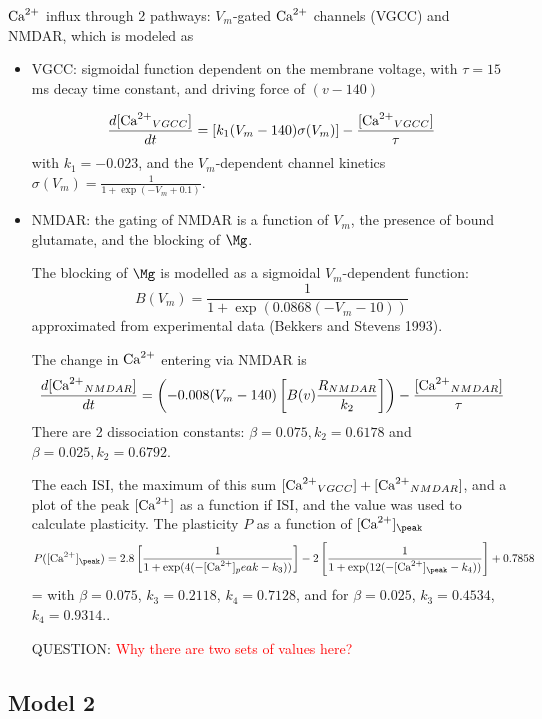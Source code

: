${\text{Ca}^{2+}}$ influx through 2 pathways: $V_m$-gated ${\text{Ca}^{2+}}$ channels (VGCC) and NMDAR,
which is modeled as
\begin{itemize}
  \item VGCC: sigmoidal function dependent on the membrane voltage, with $\tau
  = 15$ ms decay time constant, and driving force of $(v-140)$
  
\begin{equation}
\frac{d[{\text{Ca}^{2+}}_{VGCC}]}{dt} = \left[ k_1(V_m-140)\sigma(V_m) \right] -
\frac{[{\text{Ca}^{2+}}_{VGCC}]}{\tau}
\end{equation}  
with $k_1 = -0.023$, and the $V_m$-dependent channel kinetics
$\sigma(V_m) = \frac{1}{1+\exp(-V_m+0.1)}$.

  \item NMDAR: the gating of NMDAR is a function of $V_m$, the presence of
  bound glutamate, and the blocking of $\Mg$.
  
  The blocking of $\Mg$ is modelled as a sigmoidal $V_m$-dependent function:
  \begin{equation}
  B(V_m) = 	\frac{1}{1+\exp(0.0868 (-V_m-10))}
  \end{equation}
  approximated from experimental data (Bekkers and Stevens 1993).
  
  The change in ${\text{Ca}^{2+}}$ entering via NMDAR is
\begin{equation}
\frac{d[{\text{Ca}^{2+}}_{NMDAR}]}{dt} = \left(  -0.008 (V_m-140) \left[
B(v)\frac{R_{NMDAR}}{k_2} \right] \right) - \frac{[{\text{Ca}^{2+}}_{NMDAR}]}{\tau}
\end{equation}
There are 2 dissociation constants: $\beta = 0.075, k_2 = 0.6178$ and 
$\beta = 0.025, k_2 = 0.6792$.

The each ISI, the maximum of this sum $[{\text{Ca}^{2+}}_{VGCC}]+[{\text{Ca}^{2+}}_{NMDAR}]$, and a
plot of the peak $[{\text{Ca}^{2+}}]$ as a function if ISI, and the value was used to
calculate plasticity.
The plasticity $P$ as a function of $[\Ca]_\peak$
\begin{equation}
P([\Ca]_\peak) = 2.8 \left[ \frac{1}{1+\exp(4(-[\Ca]_peak - k_3))}  \right]
 - 2 \left[ \frac{1}{1+ \exp(12(-[\Ca]_\peak - k_4))} \right] + 0.7858
\end{equation}=
with $\beta = 0.075$, $k_3 = 0.2118$, $k_4 = 0.7128$, and for  $\beta= 0.025$,
$k_3 = 0.4534$, $k_4 = 0.9314.$.

QUESTION: \textcolor{red}{Why there are two sets of values here?}

\end{itemize}

\subsection{Model 2}

